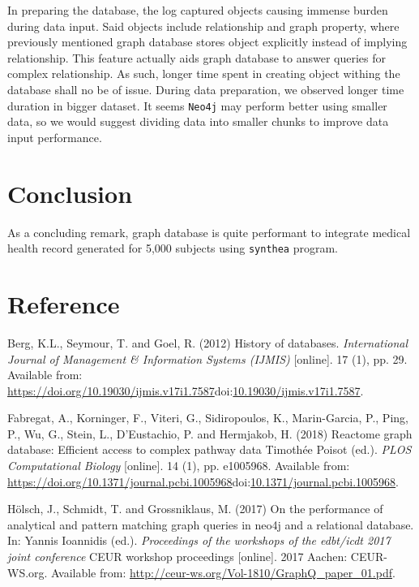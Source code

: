 \documentclass[]{article}
\begin{document}
In preparing the database, the log captured objects causing immense
burden during data input. Said objects include relationship and graph
property, where previously mentioned graph database stores object
explicitly instead of implying relationship. This feature actually aids
graph database to answer queries for complex relationship. As such,
longer time spent in creating object withing the database shall no be of
issue. During data preparation, we observed longer time duration in
bigger dataset. It seems \texttt{Neo4j} may perform better using smaller
data, so we would suggest dividing data into smaller chunks to improve
data input performance.

\hypertarget{conclusion}{%
\section{Conclusion}\label{conclusion}}

As a concluding remark, graph database is quite performant to integrate
medical health record generated for 5,000 subjects using
\texttt{synthea} program.

\hypertarget{reference}{%
\section*{Reference}\label{reference}}

\clearpage

\hypertarget{refs}{}
\leavevmode\hypertarget{ref-Berg2012}{}%
Berg, K.L., Seymour, T. and Goel, R. (2012) History of databases.
\emph{International Journal of Management \& Information Systems
(IJMIS)} {[}online{]}. 17 (1), pp. 29. Available from:
\url{https://doi.org/10.19030/ijmis.v17i1.7587}doi:\href{https://doi.org/10.19030/ijmis.v17i1.7587}{10.19030/ijmis.v17i1.7587}.

\leavevmode\hypertarget{ref-Fabregat2018}{}%
Fabregat, A., Korninger, F., Viteri, G., Sidiropoulos, K., Marin-Garcia,
P., Ping, P., Wu, G., Stein, L., D'Eustachio, P. and Hermjakob, H.
(2018) Reactome graph database: Efficient access to complex pathway data
Timothée Poisot (ed.). \emph{PLOS Computational Biology} {[}online{]}.
14 (1), pp. e1005968. Available from:
\url{https://doi.org/10.1371/journal.pcbi.1005968}doi:\href{https://doi.org/10.1371/journal.pcbi.1005968}{10.1371/journal.pcbi.1005968}.

\leavevmode\hypertarget{ref-Holsch2017}{}%
Hölsch, J., Schmidt, T. and Grossniklaus, M. (2017) On the performance
of analytical and pattern matching graph queries in neo4j and a
relational database. In: Yannis Ioannidis (ed.). \emph{Proceedings of
the workshops of the edbt/icdt 2017 joint conference} CEUR workshop
proceedings {[}online{]}. 2017 Aachen: CEUR-WS.org. Available from:
\url{http://ceur-ws.org/Vol-1810/GraphQ_paper_01.pdf}.
\end{document}
